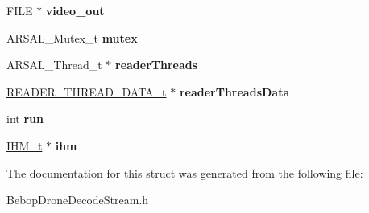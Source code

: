 \begin{DoxyCompactItemize}
\item 
\hypertarget{structBD__MANAGER__t_a6ef2f0ab25b4ec27a0db6e5b2d45f665}{}F\+I\+L\+E $\ast$ {\bfseries video\+\_\+out}\label{structBD__MANAGER__t_a6ef2f0ab25b4ec27a0db6e5b2d45f665}

\item 
\hypertarget{structBD__MANAGER__t_a6e94ed60b9a8b7bf5172f3454179f23a}{}A\+R\+S\+A\+L\+\_\+\+Mutex\+\_\+t {\bfseries mutex}\label{structBD__MANAGER__t_a6e94ed60b9a8b7bf5172f3454179f23a}

\item 
\hypertarget{structBD__MANAGER__t_aa3b7db68f7f44df515ef261d3875fb70}{}A\+R\+S\+A\+L\+\_\+\+Thread\+\_\+t $\ast$ {\bfseries reader\+Threads}\label{structBD__MANAGER__t_aa3b7db68f7f44df515ef261d3875fb70}

\item 
\hypertarget{structBD__MANAGER__t_a8e51ed4fdf0e0bd52030fef9b6c44da2}{}\hyperlink{structREADER__THREAD__DATA__t}{R\+E\+A\+D\+E\+R\+\_\+\+T\+H\+R\+E\+A\+D\+\_\+\+D\+A\+T\+A\+\_\+t} $\ast$ {\bfseries reader\+Threads\+Data}\label{structBD__MANAGER__t_a8e51ed4fdf0e0bd52030fef9b6c44da2}

\item 
\hypertarget{structBD__MANAGER__t_a8a4ceedf2f1c86686f2144e797ec1152}{}int {\bfseries run}\label{structBD__MANAGER__t_a8a4ceedf2f1c86686f2144e797ec1152}

\item 
\hypertarget{structBD__MANAGER__t_a8e71767d59e5387c094236b521cf677c}{}\hyperlink{structIHM__t}{I\+H\+M\+\_\+t} $\ast$ {\bfseries ihm}\label{structBD__MANAGER__t_a8e71767d59e5387c094236b521cf677c}

\end{DoxyCompactItemize}


The documentation for this struct was generated from the following file\+:\begin{DoxyCompactItemize}
\item 
Bebop\+Drone\+Decode\+Stream.\+h\end{DoxyCompactItemize}
